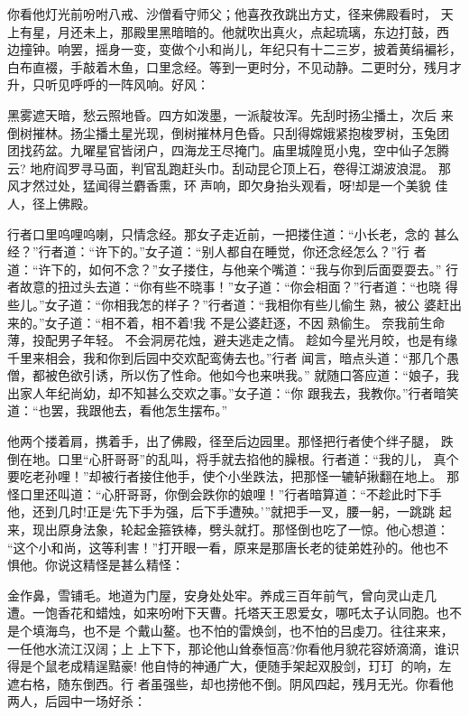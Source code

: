 你看他灯光前吩咐八戒、沙僧看守师父；他喜孜孜跳出方丈，径来佛殿看时，
天上有星，月还未上，那殿里黑暗暗的。他就吹出真火，点起琉璃，东边打鼓，西
边撞钟。响罢，摇身一变，变做个小和尚儿，年纪只有十二三岁，披着黄绢褊衫，
白布直裰，手敲着木鱼，口里念经。等到一更时分，不见动静。二更时分，残月才
升，只听见呼呼的一阵风响。好风：

黑雾遮天暗，愁云照地昏。四方如泼墨，一派靛妆浑。先刮时扬尘播土，次后
来倒树摧林。扬尘播土星光现，倒树摧林月色昏。只刮得嫦娥紧抱梭罗树，玉兔团
团找药盆。九曜星官皆闭户，四海龙王尽掩门。庙里城隍觅小鬼，空中仙子怎腾云?
地府阎罗寻马面，判官乱跑赶头巾。刮动昆仑顶上石，卷得江湖波浪混。
那风才然过处，猛闻得兰麝香熏，环声响，即欠身抬头观看，呀!却是一个美貌
佳人，径上佛殿。

行者口里呜哩呜喇，只情念经。那女子走近前，一把搂住道：“小长老，念的
甚么经？”行者道：“许下的。”女子道：“别人都自在睡觉，你还念经怎么？”行
者道：“许下的，如何不念？”女子搂住，与他亲个嘴道：“我与你到后面耍耍去。”
行者故意的扭过头去道：“你有些不晓事！”女子道：“你会相面？”行者道：“也晓
得些儿。”女子道：“你相我怎的样子？”行者道：“我相你有些儿偷生熟，被公
婆赶出来的。”女子道：“相不着，相不着!我
不是公婆赶逐，不因熟偷生。
奈我前生命薄，投配男子年轻。
不会洞房花烛，避夫逃走之情。
趁如今星光月皎，也是有缘千里来相会，我和你到后园中交欢配鸾俦去也。”行者
闻言，暗点头道：“那几个愚僧，都被色欲引诱，所以伤了性命。他如今也来哄我。”
就随口答应道：“娘子，我出家人年纪尚幼，却不知甚么交欢之事。”女子道：“你
跟我去，我教你。”行者暗笑道：“也罢，我跟他去，看他怎生摆布。”

他两个搂着肩，携着手，出了佛殿，径至后边园里。那怪把行者使个绊子腿，
跌倒在地。口里“心肝哥哥”的乱叫，将手就去掐他的臊根。行者道：“我的儿，
真个要吃老孙哩！”却被行者接住他手，使个小坐跌法，把那怪一辘轳揪翻在地上。
那怪口里还叫道：“心肝哥哥，你倒会跌你的娘哩！”行者暗算道：“不趁此时下手
他，还到几时!正是‘先下手为强，后下手遭殃。’”就把手一叉，腰一躬，一跳跳
起来，现出原身法象，轮起金箍铁棒，劈头就打。那怪倒也吃了一惊。他心想道：
“这个小和尚，这等利害！”打开眼一看，原来是那唐长老的徒弟姓孙的。他也不
惧他。你说这精怪是甚么精怪：

金作鼻，雪铺毛。地道为门屋，安身处处牢。养成三百年前气，曾向灵山走几
遭。一饱香花和蜡烛，如来吩咐下天曹。托塔天王恩爱女，哪吒太子认同胞。也不
是个填海鸟，也不是
个戴山鳌。也不怕的雷焕剑，也不怕的吕虔刀。往往来来，一任他水流江汉阔；上
上下下，那论他山耸泰恒高?你看他月貌花容娇滴滴，谁识得是个鼠老成精逞黠豪!
他自恃的神通广大，便随手架起双股剑，玎玎的响，左遮右格，随东倒西。行
者虽强些，却也捞他不倒。阴风四起，残月无光。你看他两人，后园中一场好杀：

